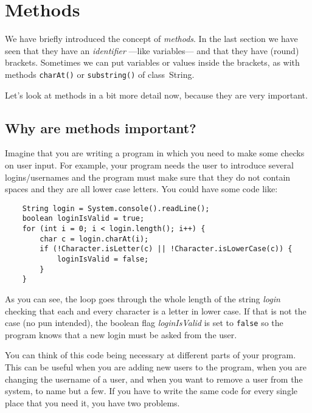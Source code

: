 
%
%
%
%
%


\section{Methods}
\label{sec:methods}

We have briefly introduced the concept of
\emph{methods}. In the last section we have seen that they have an
\emph{identifier} ---like variables--- and that they have (round)
brackets. Sometimes we can put variables or values inside the
brackets, as with methods \verb+charAt()+ or \verb+substring()+ of
class~String. 

Let's look at methods in a bit more detail now, because they are very
important. 

\subsection{Why are methods important?}

Imagine that you are writing a program in which you need to make some
checks on user input. For example, your program needs the user to
introduce several logins/usernames and the program must make sure that
they do not contain spaces and they are all lower case letters. You
could have some code like:

\begin{verbatim}
    String login = System.console().readLine();
    boolean loginIsValid = true;
    for (int i = 0; i < login.length(); i++) {
        char c = login.charAt(i);
        if (!Character.isLetter(c) || !Character.isLowerCase(c)) {
            loginIsValid = false;
        }
    }
\end{verbatim}

As you can see, the loop goes through the whole length of the string
\emph{login} checking that each and every character is a letter in
lower case. If that is not the case (no pun intended), the boolean flag
\emph{loginIsValid} is set to \verb+false+ so the program knows that a
new login must be asked from the user.

You can think of this code being necessary at different parts of
your program. This can be useful when you are adding new users to the
program, when you are changing the username of a user, and when
you want to remove a user from the system, to name but a few. If you
have to write the same code for every single place that you need it,
you have two problems.

